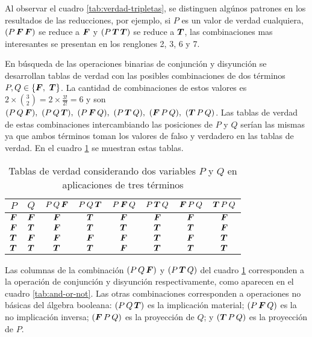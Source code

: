 Al observar el cuadro \ref{tab:verdad-tripletas}, se distinguen algúnos patrones en los resultados de las reducciones, por ejemplo, si \( P \) es un valor de verdad cualquiera, \( (P\, \boldsymbol{F}\, \boldsymbol{F}) \) se reduce a \( \boldsymbol{F} \) y \( (P\, \boldsymbol{T}\, \boldsymbol{T}) \) se reduce a \( \boldsymbol{T} \), las combinaciones mas interesantes se presentan en los renglones 2, 3, 6 y 7.

En búsqueda de las operaciones binarias de conjunción y disyunción se desarrollan tablas de verdad con las posibles combinaciones de dos términos \( P, Q \in \{ \boldsymbol{F},\ \boldsymbol{T} \} \). La cantidad de combinaciones de estos valores es \( 2 \times \binom 3 2 = 2 \times \frac{3!}{2!} = 6 \) y son \( (P\, Q\, \bs{F}) ,\ (P\, Q\, \bs{T}) ,\ (P\, \bs{F}\, Q) ,\ (P\, \bs{T}\, Q) ,\ (\bs{F}\, P\, Q) ,\ (\bs{T}\, P\, Q) \). Las tablas de verdad de estas combinaciones intercambiando las posiciones de \( P \) y \( Q \) serían las mismas ya que ambos términos toman los valores de falso y verdadero en las tablas de verdad. En el cuadro \ref{tab:verdad-pq} se muestran estas tablas.

\begin{table}[h!]
  \centering
  \begin{tabular}{|c|c||c|c|c|c|c|c|}
    \hline
    \( P \) & \( Q \) & \( P\, Q\, \boldsymbol{F} \) & \( P\, Q\, \boldsymbol{T} \) & \( P\, \boldsymbol{F}\, Q \) & \( P\, \boldsymbol{T}\, Q \) & \( \boldsymbol{F}\, P\, Q \) & \( \boldsymbol{T}\, P\, Q \) \\ [0.5ex]
    \hline
    \hline
    \( \boldsymbol{F} \) & \( \boldsymbol{F} \) & \( \boldsymbol{F} \) & \( \boldsymbol{T} \) & \( \boldsymbol{F} \) & \( \boldsymbol{F} \) & \( \boldsymbol{F} \) & \( \boldsymbol{F} \) \\
    \( \boldsymbol{F} \) & \( \boldsymbol{T} \) & \( \boldsymbol{F} \) & \( \boldsymbol{T} \) & \( \boldsymbol{T} \) & \( \boldsymbol{T} \) & \( \boldsymbol{T} \) & \( \boldsymbol{F} \) \\
    \( \boldsymbol{T} \) & \( \boldsymbol{F} \) & \( \boldsymbol{F} \) & \( \boldsymbol{F} \) & \( \boldsymbol{F} \) & \( \boldsymbol{T} \) & \( \boldsymbol{F} \) & \( \boldsymbol{T} \) \\
    \( \boldsymbol{T} \) & \( \boldsymbol{T} \) & \( \boldsymbol{T} \) & \( \boldsymbol{T} \) & \( \boldsymbol{F} \) & \( \boldsymbol{T} \) & \( \boldsymbol{T} \) & \( \boldsymbol{T} \) \\
    \hline
  \end{tabular}
  \caption{Tablas de verdad considerando dos variables \( P \) y \( Q \) en aplicaciones de tres términos}
  \label{tab:verdad-pq}
\end{table}

Las columnas de la combinación \( (P\, Q\, \boldsymbol{F}) \) y \( (P\, \boldsymbol{T}\, Q) \) del cuadro \ref{tab:verdad-pq} corresponden a la operación de conjunción y disyunción respectivamente, como aparecen en el cuadro \ref{tab:and-or-not}. Las otras combinaciones corresponden a operaciones no básicas del álgebra booleana: \( (P\, Q\, \boldsymbol{T}) \) es la implicación material; \( (P\, \boldsymbol{F}\, Q) \) es la no implicación inversa; \( (\boldsymbol{F}\, P\, Q) \) es la proyección de \( Q \); y \( (\boldsymbol{T}\, P\, Q) \) es la proyección de \( P \).

